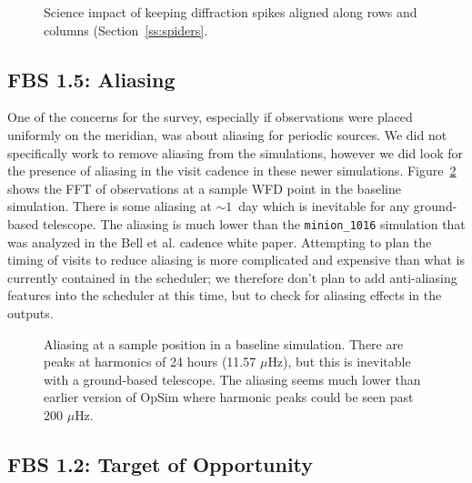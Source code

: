 \begin{figure}
\caption{Science impact of keeping diffraction spikes aligned along rows and columns (Section~\ref{ss:spiders}. }
\label{fig:spider_radar}
\end{figure}


\subsection{FBS 1.5: Aliasing}\label{ss:aliasing}

One of the concerns for the survey, especially if observations were placed uniformly on the meridian, was about aliasing for periodic sources. We did not specifically work to remove aliasing from the simulations, however we did look for the presence of aliasing in the visit cadence in these newer simulations.  Figure~\ref{fig:alias} shows the FFT of observations at a sample WFD point in the baseline simulation. There is some aliasing at $\sim1$\ day which is inevitable for any ground-based telescope.  The aliasing is much lower than the {\tt minion\_1016} simulation that was analyzed in the Bell et al. cadence white paper. Attempting to plan the timing of visits to reduce aliasing is more complicated and expensive than what is currently contained in the scheduler; we therefore don't plan to add anti-aliasing features into the scheduler at this time, but to check for aliasing effects in the outputs.

\begin{figure}
\caption{Aliasing at a sample position in a baseline simulation. There are peaks at harmonics of 24 hours (11.57 $\mu$Hz), but this is inevitable with a ground-based telescope. The aliasing seems much lower than earlier version of OpSim where harmonic peaks could be seen past 200 $\mu$Hz.}\label{fig:alias}
\end{figure}


\subsection{FBS 1.2: Target of Opportunity}\label{ss:too}

